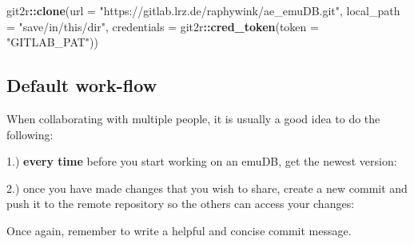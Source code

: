 \documentclass[]{book}
\newenvironment{Shaded}{\begin{snugshade}}{\end{snugshade}}
\newcommand{\CommentTok}[1]{\textcolor[rgb]{0.56,0.35,0.01}{\textit{#1}}}
\newcommand{\DataTypeTok}[1]{\textcolor[rgb]{0.13,0.29,0.53}{#1}}
\newcommand{\KeywordTok}[1]{\textcolor[rgb]{0.13,0.29,0.53}{\textbf{#1}}}
\newcommand{\NormalTok}[1]{#1}
\newcommand{\OperatorTok}[1]{\textcolor[rgb]{0.81,0.36,0.00}{\textbf{#1}}}
\newcommand{\StringTok}[1]{\textcolor[rgb]{0.31,0.60,0.02}{#1}}
\begin{document}
\begin{Shaded}
\begin{Highlighting}[]
\NormalTok{git2r}\OperatorTok{::}\KeywordTok{clone}\NormalTok{(}\DataTypeTok{url =} \StringTok{"https://gitlab.lrz.de/raphywink/ae_emuDB.git"}\NormalTok{,}
             \DataTypeTok{local_path =} \StringTok{"save/in/this/dir"}\NormalTok{,}
             \DataTypeTok{credentials =}\NormalTok{ git2r}\OperatorTok{::}\KeywordTok{cred_token}\NormalTok{(}\DataTypeTok{token =} \StringTok{"GITLAB_PAT"}\NormalTok{))}
\end{Highlighting}
\end{Shaded}

\hypertarget{default-work-flow}{%
\subsection{Default work-flow}\label{default-work-flow}}

When collaborating with multiple people, it is usually a good idea to do the following:

1.) \textbf{every time} before you start working on an emuDB, get the newest version:

\begin{Shaded}
\end{Shaded}

2.) once you have made changes that you wish to share, create a new commit and push it to the remote repository so the others can access your changes:

\begin{Shaded}
\end{Shaded}

Once again, remember to write a helpful and concise commit message.
\end{document}
